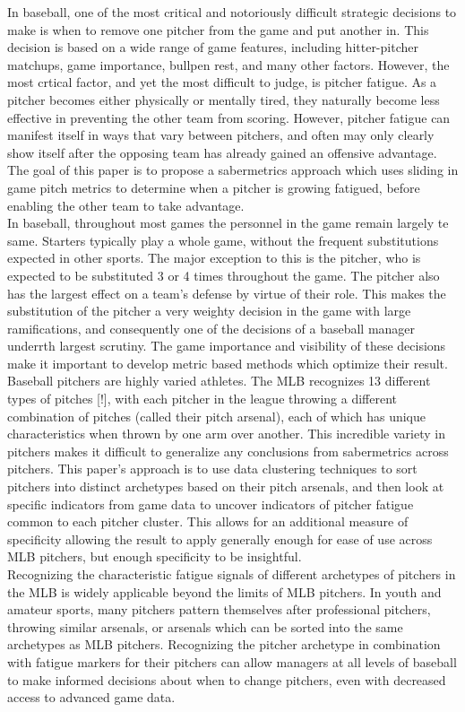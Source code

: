 \documentclass[12 pt]{article}
\begin{document}
\indent In baseball, one of the most critical and notoriously difficult strategic 
decisions to make is when to remove one pitcher from the game and put another in.
This decision is based on a wide range of game features, including hitter-pitcher 
matchups, game importance, bullpen rest, and many other factors. However, the most 
crtical factor, and yet the most difficult to judge, is pitcher fatigue. As a pitcher 
becomes either physically or mentally tired, they naturally become less effective
in preventing the other team from scoring. However, pitcher fatigue can manifest itself in ways 
that vary between pitchers, and often may only clearly show itself after the opposing 
team has already gained an offensive advantage. The goal of this paper is to propose 
a sabermetrics approach which uses sliding in game pitch metrics to determine when a 
pitcher is growing fatigued, before enabling the other team to take advantage.
\\ \indent In baseball, throughout most games the personnel in the game remain largely te same. 
Starters typically play a whole game, without the frequent substitutions expected 
in other sports. The major exception to this is the pitcher, who is expected to be substituted 3 or 4
times throughout the game. The pitcher also has the largest effect on a team's 
defense by virtue of their role. This makes the substitution of the pitcher 
a very weighty decision in the game with large ramifications, and consequently one of 
the decisions of a baseball manager underrth largest scrutiny. The game importance and 
visibility of these decisions make it important to develop metric based methods which 
optimize their result. 
\\ \indent Baseball pitchers are highly varied athletes. The MLB recognizes 13 
different types of pitches [!], with each pitcher in the league throwing a
different combination of pitches (called their pitch arsenal), each of which has 
unique characteristics when thrown by one arm over another. This incredible variety 
in pitchers makes it difficult to generalize any conclusions from sabermetrics 
across pitchers. This paper's approach is to use data clustering techniques to 
sort pitchers into distinct archetypes based on their pitch arsenals, and then 
look at specific indicators from game data to uncover indicators of pitcher fatigue 
common to each pitcher cluster. This allows for an additional measure of specificity 
allowing the result to apply generally enough for ease of use across MLB pitchers, 
but enough specificity to be insightful.
\\ \indent Recognizing the characteristic fatigue signals of different archetypes of 
pitchers in the MLB is widely applicable beyond the limits of MLB pitchers. In youth and 
amateur sports, many pitchers pattern themselves after professional pitchers, throwing similar 
arsenals, or arsenals which can be sorted into the same archetypes as MLB pitchers. 
Recognizing the pitcher archetype in combination with fatigue markers for their pitchers can allow 
managers at all levels of baseball to make informed decisions about when to change pitchers, 
even with decreased access to advanced game data. \\
\end{document}
